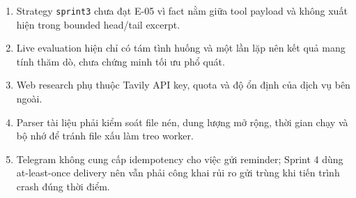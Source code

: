 \documentclass[12pt,a4paper]{article}
\begin{document}
\begin{enumerate}
    \item Strategy \texttt{sprint3} chưa đạt E-05 vì fact nằm giữa tool payload và không xuất hiện trong bounded head/tail excerpt.

    \item Live evaluation hiện chỉ có tám tình huống và một lần lặp nên kết quả mang tính thăm dò, chưa chứng minh tối ưu phổ quát.

    \item Web research phụ thuộc Tavily API key, quota và độ ổn định của dịch vụ bên ngoài.

    \item Parser tài liệu phải kiểm soát file nén, dung lượng mở rộng, thời gian chạy và bộ nhớ để tránh file xấu làm treo worker.

    \item Telegram không cung cấp idempotency cho việc gửi reminder; Sprint 4 dùng at-least-once delivery nên vẫn phải công khai rủi ro gửi trùng khi tiến trình crash đúng thời điểm.
\end{enumerate}
\end{document}
